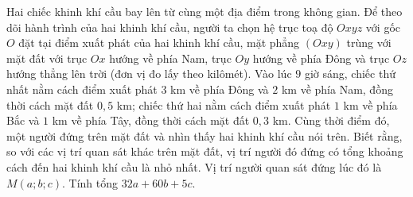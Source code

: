 \begin{ex}%
Hai chiếc khinh khí cầu bay lên từ cùng một địa điểm trong không gian. Để theo dõi hành trình của hai khinh khí cầu, người ta chọn hệ trục toạ độ $Oxyz$  với gốc $O$  đặt tại điểm xuất phát của hai khinh khí cầu, mặt phẳng $(Oxy)$ trùng với mặt đất với trục $Ox$  hướng về phía Nam, trục $Oy$  hướng về phía Đông và trục $Oz$  hướng thẳng lên trời (đơn vị đo lấy theo kilômét). Vào lúc $9$ giờ sáng, chiếc thứ nhất nằm cách điểm xuất phát $3$ km về phía Đông và $2$ km về phía Nam, đồng thời cách mặt đất $0{,}5$ km; chiếc thứ hai nằm cách điểm xuất phát $1$ km về phía Bắc và $1$ km về phía Tây, đồng thời cách mặt đất $0{,}3$ km. Cùng thời điểm đó, một người đứng
trên mặt đất và nhìn thấy hai khinh khí cầu nói trên. Biết rằng, so với các vị trí quan sát khác trên mặt đất, vị trí người đó đứng có tổng khoảng cách đến hai khinh khí cầu là nhỏ nhất. Vị trí người quan sát đứng lúc đó là $M(a;b;c)$. Tính tổng $32a+60b+5c$.

\end{ex}
